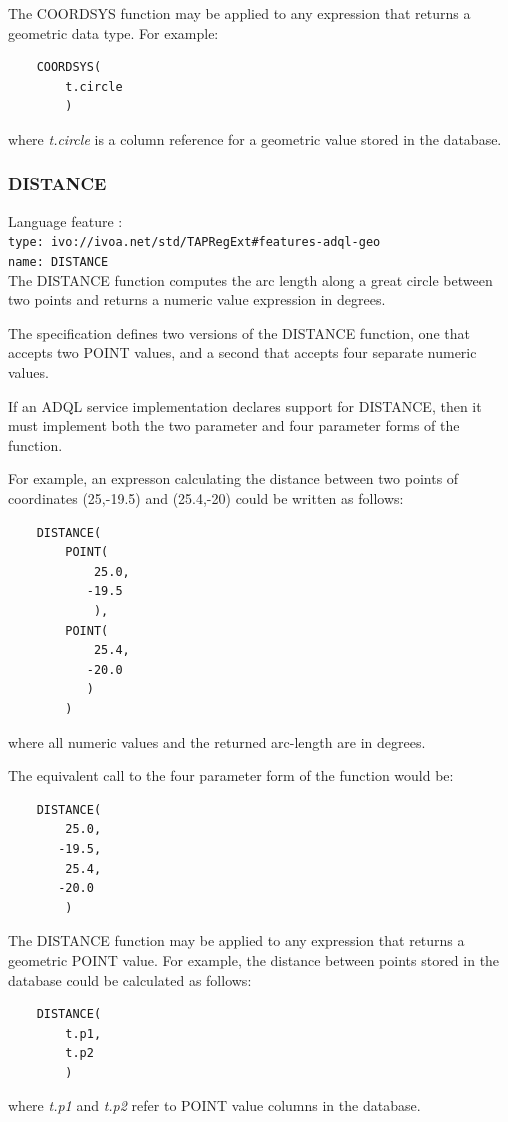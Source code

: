 \documentclass[11pt,a4paper]{ivoa}
\begin{document}
The COORDSYS function may be applied to any expression that returns a
geometric data type. For example:
\begin{verbatim}
    COORDSYS(
        t.circle
        )
\end{verbatim}
\noindent
where \textit{t.circle} is a column reference for a geometric value
stored in the database.

\subsubsection{DISTANCE}
\label{sec:functions.geom.distance}
{\footnotesize Language feature :}\\
{\footnotesize \verb|type: ivo://ivoa.net/std/TAPRegExt#features-adql-geo|}\\
{\footnotesize \verb|name: DISTANCE|}\\

The DISTANCE function computes the arc length along a great circle between two
points and returns a numeric value expression in degrees.

The specification defines two versions of the DISTANCE function, one that
accepts two POINT values, and a second that accepts four separate numeric
values.

If an ADQL service implementation declares support for DISTANCE,
then it must implement both the two parameter and four parameter
forms of the function.

For example, an expresson calculating the distance between two points of
coordinates (25,-19.5) and (25.4,-20) could be written as follows:
\begin{verbatim}
    DISTANCE(
        POINT(
            25.0,
           -19.5
            ),
        POINT(
            25.4,
           -20.0
           )
        )
\end{verbatim}
\noindent
where all numeric values and the returned arc-length are in degrees.

The equivalent call to the four parameter form of the function would be:
\begin{verbatim}
    DISTANCE(
        25.0,
       -19.5,
        25.4,
       -20.0
        )
\end{verbatim}

The DISTANCE function may be applied to any expression that returns a
geometric POINT value.
For example, the distance between points stored in the database could
be calculated as follows:
\begin{verbatim}
    DISTANCE(
        t.p1,
        t.p2
        )
\end{verbatim}
\noindent
where \textit{t.p1} and \textit{t.p2} refer to POINT value columns in the
database.
\end{document}
